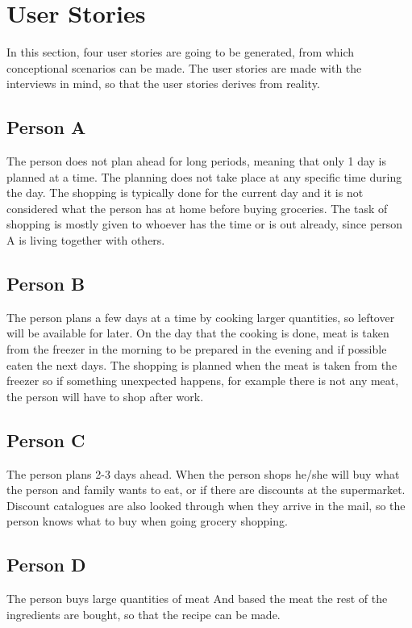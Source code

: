 \section{User Stories}

In this section, four user stories are going to be generated, from which conceptional scenarios can be made. The user stories are made with the interviews in mind, so that the user stories derives from reality.

\subsection{Person A}
The person does not plan ahead for long periods, meaning that only 1 day is planned at a time. The planning does not take place at any specific time during the day. The shopping is typically done for the current day and it is not considered what the person has at home before buying groceries. The task of shopping is mostly given to whoever has the time or is out already, since person A is living together with others.

\subsection{Person B}
The person plans a few days at a time by cooking larger quantities, so leftover will be available for later. On the day that the cooking is done, meat is taken from the freezer in the morning to be prepared in the evening and if possible eaten the next days. The shopping is planned when the meat is taken from the freezer so if something unexpected happens, for example there is not any meat, the person will have to shop after work.  
 
\subsection{Person C}
The person plans 2-3 days ahead. When the person shops he/she will buy what the person and family wants to eat, or if there are discounts at the supermarket. Discount catalogues are also looked through when they arrive in the mail, so the person knows what to buy when going grocery shopping.

\subsection{Person D}
The person buys large quantities of meat And based the meat the rest of the ingredients are bought, so that the recipe can be made.
